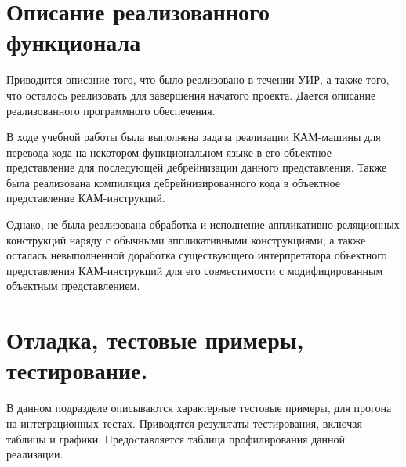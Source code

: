 \section{Описание реализованного функционала}

\begin{annotation}
	Приводится описание того, что было реализовано в течении УИР, а также того, что осталось реализовать для завершения начатого проекта. Дается описание реализованного программного обеспечения.
\end{annotation}

В ходе учебной работы была выполнена задача реализации КАМ-машины для перевода кода на некотором функциональном языке в его объектное представление для последующей дебрейнизации данного представления. Также была реализована компиляция дебрейнизированного кода в объектное представление КАМ-инструкций.

Однако, не была реализована обработка и исполнение аппликативно-реляционных конструкций наряду с обычными аппликативными конструкциями, а также осталась невыполненной доработка существующего интерпретатора объектного представления КАМ-инструкций для его совместимости с модифицированным объектным представлением.


\section{Отладка, тестовые примеры, тестирование.}

\begin{annotation}
	В данном подразделе описываются характерные тестовые примеры, для прогона на интеграционных тестах. Приводятся результаты тестирования, включая таблицы и графики. Предоставляется таблица профилирования данной реализации.
\end{annotation}


